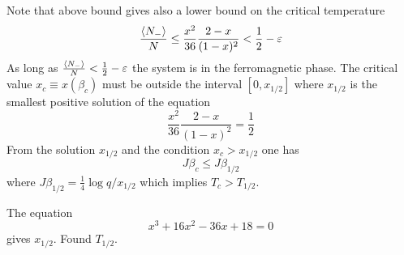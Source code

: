 \documentclass[../main/main.tex]{subfiles}
\begin{document}
Note that above bound gives also a lower bound on the critical temperature
\begin{equation}
    \frac{\expval{N_-} }{N} \le \frac{x^2}{36} \frac{2-x}{(1-x)^2} < \frac{1}{2} - \varepsilon
\end{equation}
As long as \(   \frac{\expval{N_-} }{N}  < \frac{1}{2} - \varepsilon  \) the system is in the ferromagnetic phase. The critical value \( x_c \equiv x (\beta _c) \) must be outside the interval \( [0,x_{1/2}] \) where \( x_{1/2} \)   is the smallest positive solution of the equation
\begin{equation}
  \frac{x^2}{36} \frac{2-x}{(1-x)^2} = \frac{1}{2}
\end{equation}
From the solution \( x_{1/2} \) and the condition \( x_c > x_{1/2} \) one has
\begin{equation}
  J \beta _c \le J \beta_{1/2}
\end{equation}
where \( J \beta _{1/2} = \frac{1}{4} \log{q/x_{1/2}}  \) which implies \(  T_c > T_{1/2} \).
\begin{exercise}
The equation
\begin{equation}
  x^3 + 16x^2 - 36 x + 18 = 0
\end{equation}
gives \( x_{1/2} \). Found \( T_{1/2} \).
\end{exercise}
\end{document}
